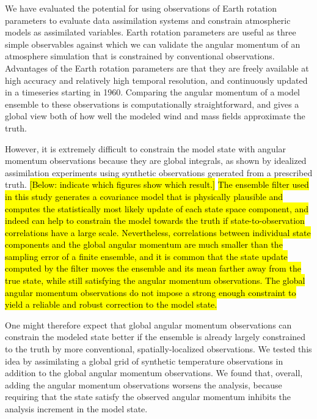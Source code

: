 We have evaluated the potential for using observations of Earth rotation parameters to evaluate data assimilation systems and constrain atmospheric models as assimilated variables.  
%
Earth rotation parameters are useful as three simple observables against which we can validate the angular momentum of an atmosphere simulation that is constrained by conventional observations.  
Advantages of the Earth rotation parameters are that they are freely available \citep{iers} at high accuracy and relatively high temporal resolution, and continuously updated in a timeseries starting in 1960. 
Comparing the angular momentum of a model ensemble to these observations is computationally straightforward, and 
gives a global view both of how well the modeled wind and mass fields approximate the truth.

However, it is extremely difficult to constrain the model state with angular momentum observations because they are global integrals, as shown by 
idealized assimilation experiments using synthetic observations generated from a prescribed truth.
\hl{[Below: indicate which figures show which result.]}
\hl{The ensemble filter used in this study generates a covariance model that is physically plausible and computes the statistically most likely update of each state space component, and indeed can help to constrain the model towards the truth if state-to-observation correlations have a large scale. 
Nevertheless, correlations between individual state components and the global angular momentum are much smaller than the sampling error of a finite ensemble, and it is common that 
the state update computed by the filter moves the ensemble and its mean farther away from the true state, while still satisfying the angular momentum observations. 
The global angular momentum observations do not impose a strong enough constraint to yield a reliable and robust correction to the model state.} 

One might therefore expect that global angular momentum observations can constrain the modeled state better if the ensemble is already largely constrained to the truth by more conventional, spatially-localized observations. 
We tested this idea by assimilating a global grid of synthetic temperature observations in addition to the global angular momentum observations. 
We found that, overall, adding the angular momentum observations worsens the analysis, 
because requiring that the state satisfy the observed angular momentum inhibits the analysis increment in the model state.  

